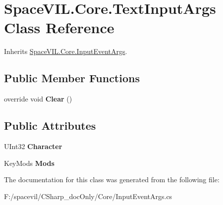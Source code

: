 \hypertarget{class_space_v_i_l_1_1_core_1_1_text_input_args}{}\section{Space\+V\+I\+L.\+Core.\+Text\+Input\+Args Class Reference}
\label{class_space_v_i_l_1_1_core_1_1_text_input_args}


Inherits \mbox{\hyperlink{class_space_v_i_l_1_1_core_1_1_input_event_args}{Space\+V\+I\+L.\+Core.\+Input\+Event\+Args}}.

\subsection*{Public Member Functions}
\begin{DoxyCompactItemize}
\item 
\mbox{\label{class_space_v_i_l_1_1_core_1_1_text_input_args_a6f6a339d6cdc2220b27e45cbc6696b07}} 
override void {\bfseries Clear} ()
\end{DoxyCompactItemize}
\subsection*{Public Attributes}
\begin{DoxyCompactItemize}
\item 
\mbox{\label{class_space_v_i_l_1_1_core_1_1_text_input_args_a748163b19d478446685e5ab54eef6e5e}} 
U\+Int32 {\bfseries Character}
\item 
\mbox{\label{class_space_v_i_l_1_1_core_1_1_text_input_args_acb44af185bdc617bdc3a71cd5fb5fc43}} 
Key\+Mods {\bfseries Mods}
\end{DoxyCompactItemize}


The documentation for this class was generated from the following file\+:\begin{DoxyCompactItemize}
\item 
F\+:/spacevil/\+C\+Sharp\+\_\+doc\+Only/\+Core/Input\+Event\+Args.\+cs\end{DoxyCompactItemize}
